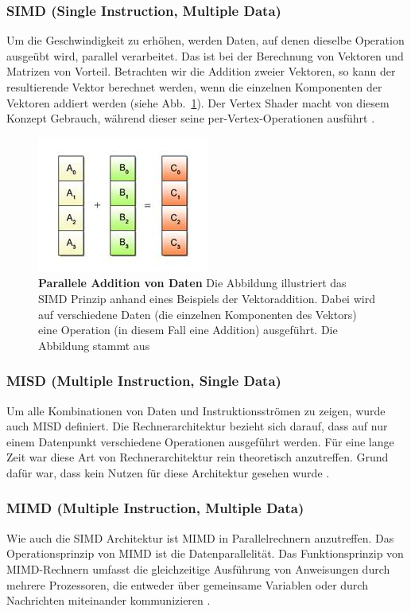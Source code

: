 \subsubsection*{SIMD (Single Instruction, Multiple Data)}
Um die Geschwindigkeit zu erhöhen, werden Daten, auf denen dieselbe Operation ausgeübt wird, parallel verarbeitet.
Das ist bei der Berechnung von Vektoren und Matrizen von Vorteil.
Betrachten wir die Addition zweier Vektoren, so kann der resultierende Vektor berechnet werden, wenn die einzelnen Komponenten der Vektoren addiert werden (siehe Abb.~\ref{fig:simd_pattern}). Der Vertex Shader macht von diesem Konzept Gebrauch, während dieser seine per-Vertex-Operationen ausführt \cite{DalCin1996}.
\begin{figure}[htb]
  \centering  
  \includegraphics[scale=0.9]{Bilder/Simd_pattern.jpg}
  \caption[SIMD Pattern]{\textbf{Parallele Addition von Daten} Die Abbildung illustriert das SIMD Prinzip anhand eines Beispiels der Vektoraddition. Dabei wird auf verschiedene Daten (die einzelnen Komponenten des Vektors) eine Operation (in diesem Fall eine Addition) ausgeführt.
  Die Abbildung stammt aus \cite{Sony2008}}
  \label{fig:simd_pattern}
\end{figure} 
\subsubsection*{MISD (Multiple Instruction, Single Data)}
Um alle Kombinationen von Daten und Instruktionsströmen zu zeigen, wurde auch MISD definiert.
Die Rechnerarchitektur bezieht sich darauf, dass auf nur einem Datenpunkt verschiedene Operationen ausgeführt werden.
Für eine lange Zeit war diese Art von Rechnerarchitektur rein theoretisch anzutreffen.
Grund dafür war, dass kein Nutzen für diese Architektur gesehen wurde \cite{Flynn1996}.
\subsubsection*{MIMD (Multiple Instruction, Multiple Data)}
Wie auch die SIMD Architektur ist MIMD in Parallelrechnern anzutreffen.
Das Operationsprinzip von MIMD ist die Datenparallelität.
Das Funktionsprinzip von MIMD-Rechnern umfasst die gleichzeitige Ausführung von Anweisungen durch mehrere Prozessoren, die entweder über gemeinsame Variablen oder durch Nachrichten miteinander kommunizieren \cite{DalCin1996}. \newline

